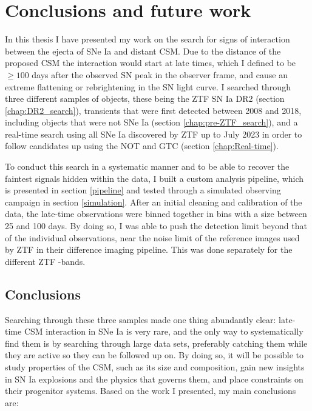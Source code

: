 \documentclass[a4paper,oneside,12pt, class=Latex/Classes/PhDthesisPSnPDF, crop=false]{standalone}
\begin{document}
\doublespacing
\chapter{Conclusions and future work}
\label{chap:Conc_and_fut}

In this thesis I have presented my work on the search for signs of interaction between the ejecta of SNe Ia and distant CSM. Due to the distance of the proposed CSM the interaction would start at late times, which I defined to be $\geq100$ days after the observed SN peak in the observer frame, and cause an extreme flattening or rebrightening in the SN light curve. I searched through three different samples of objects, these being the ZTF SN Ia DR2 (section \ref{chap:DR2_search}), transients that were first detected between 2008 and 2018, including objects that were not SNe Ia (section \ref{chap:pre-ZTF_search}), and a real-time search using all SNe Ia discovered by ZTF up to July 2023 in order to follow candidates up using the NOT and GTC (section \ref{chap:Real-time}).

To conduct this search in a systematic manner and to be able to recover the faintest signals hidden within the data, I built a custom analysis pipeline, which is presented in section \ref{pipeline} and tested through a simulated observing campaign in section \ref{simulation}. After an initial cleaning and calibration of the data, the late-time observations were binned together in bins with a size between 25 and 100 days. By doing so, I was able to push the detection limit beyond that of the individual observations, near the noise limit of the reference images used by ZTF in their difference imaging pipeline. This was done separately for the different ZTF \ztfg\ztfr\ztfi-bands.


\section{Conclusions}
Searching through these three samples made one thing abundantly clear: late-time CSM interaction in SNe Ia is very rare, and the only way to systematically find them is by searching through large data sets, preferably catching them while they are active so they can be followed up on. By doing so, it will be possible to study properties of the CSM, such as its size and composition, gain new insights in SN Ia explosions and the physics that governs them, and place constraints on their progenitor systems. Based on the work I presented, my main conclusions are:
\end{document}
